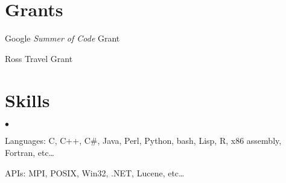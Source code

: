 \documentclass[margin,line]{res}
\newenvironment{list2}{
  \begin{list}{$\bullet$}{%
      \setlength{\itemsep}{0in}
      \setlength{\parsep}{0in} \setlength{\parskip}{0in}
      \setlength{\topsep}{0in} \setlength{\partopsep}{0in} 
      \setlength{\leftmargin}{0.2in}}}{\end{list}}
\begin{document}
\begin{resume}
\section{\sc Grants}
Google \emph{Summer of Code} Grant
\vspace*{-2.5mm}

Ross Travel Grant
\vspace*{-2.5mm}




\section{\sc Skills} 
\begin{list2}
\item Languages:  C, C++, C\#, Java, Perl, Python, bash, Lisp, R, x86 assembly, Fortran, etc\ldots
\item APIs: MPI, POSIX, Win32, .NET, Lucene, etc\ldots
\end{list2}

\end{resume}
\end{document}
